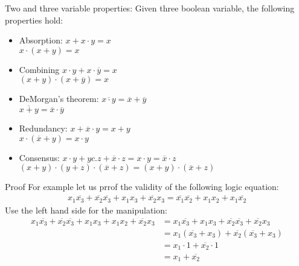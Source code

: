 \begin{parag}{Two and three variable properties:}
    Given three boolean variable, the following properties hold:
    \begin{itemize}
        \item Absorption: $x + x \cdot y = x$ \\ $x \cdot (x + y) = x$
        \item Combining $ x \cdot y + x \cdot \overline{y} = x$ \\ $ (x + y) \cdot (x + \overline{y}) = x$
        \item DeMorgan's theorem: $ \overline{x \cdot y} =  \overline{x} + \overline{y}$ \\ $\overline{x + y} = \overline{x} \cdot \overline{y}$ 
        \item Redundancy: $x + \overline{x} \cdot y = x + y$ \\ $x \cdot ( \overline{x} + y)  =  x \cdot y$
        \item Consensus: $x \cdot y + y c. z + \overline{x} \cdot z = x \cdot y = \overline{x} \cdot z$ \\ $(x + y) \cdot (y + z) \cdot ( \overline{x} + z) = (x + y) \cdot ( \overline{x} + z)$
    \end{itemize}
    \begin{subparag}{Proof}
        For example let us prrof the validity  of the following logic equation:
        \begin{align*}
            x_1 \overline{x_3} + \overline{x_2} \overline{x_3} + x_1x_3 + \overline{x_2}x_3 = \overline{x_1} \overline{x_2} + x_1x_2 + x_1 \overline{x_2}
        \end{align*}
        Use the left hand side for the manipulation:
        \begin{align*}
            x_1 \overline{x_3} + \overline{x_2} \overline{x_3} + x_1x_3 + x_1x_2 + \overline{x_2}x_3 &= x_1 \overline{x_3} + x_1x_3 + \overline{x_2} \overline{x_3} + \overline{x_2}x_3 \\
                                                                                                     &= x_1( \overline{x_3} + x_3) + \overline{x_2}( \overline{x_3} + x_3) \\
                                                                                                     &= x_1 \cdot 1 + \overline{x_2} \cdot 1 \\
                                                                                                     &= x_1 + \overline{x_2}
        \end{align*}
    \end{subparag}
\end{parag}
